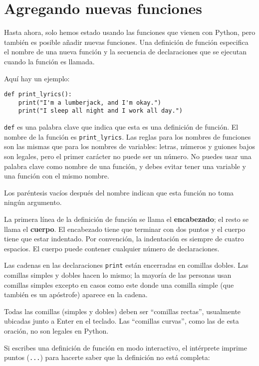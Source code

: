 \section{Agregando nuevas funciones}

Hasta ahora, solo hemos estado usando las funciones que vienen con Python, pero también es posible añadir nuevas funciones. Una definición de función especifica el nombre de una nueva función y la secuencia de declaraciones que se ejecutan cuando la función es llamada.

Aquí hay un ejemplo:

\begin{lstlisting}
def print_lyrics():
    print("I'm a lumberjack, and I'm okay.")
    print("I sleep all night and I work all day.")
\end{lstlisting}

\texttt{def} es una palabra clave que indica que esta es una definición de función. El nombre de la función es \texttt{print\_lyrics}. Las reglas para los nombres de funciones son las mismas que para los nombres de variables: letras, números y guiones bajos son legales, pero el primer carácter no puede ser un número. No puedes usar una palabra clave como nombre de una función, y debes evitar tener una variable y una función con el mismo nombre.

Los paréntesis vacíos después del nombre indican que esta función no toma ningún argumento.

La primera línea de la definición de función se llama el \textbf{encabezado}; el resto se llama el \textbf{cuerpo}. El encabezado tiene que terminar con dos puntos y el cuerpo tiene que estar indentado. Por convención, la indentación es siempre de cuatro espacios. El cuerpo puede contener cualquier número de declaraciones.

Las cadenas en las declaraciones \texttt{print} están encerradas en comillas dobles. Las comillas simples y dobles hacen lo mismo; la mayoría de las personas usan comillas simples excepto en casos como este donde una comilla simple (que también es un apóstrofe) aparece en la cadena.

Todas las comillas (simples y dobles) deben ser ``comillas rectas'', usualmente ubicadas junto a Enter en el teclado. Las ``comillas curvas'', como las de esta oración, no son legales en Python.

Si escribes una definición de función en modo interactivo, el intérprete imprime puntos (\texttt{...}) para hacerte saber que la definición no está completa:

